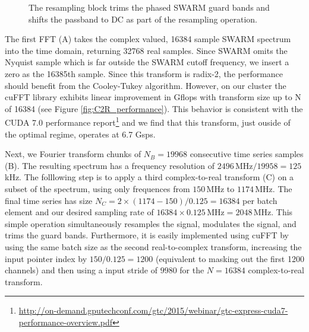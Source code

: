 \begin{figure}[t!]
\linespread{1.}\selectfont{}
\centering
{}
\label{fig:resampling_block}
\caption{The resampling block trims the phased SWARM guard bands and shifts the passband to DC as part of the 
resampling operation.}
\end{figure}

The first FFT (A) takes the complex valued, 16384 sample SWARM spectrum into the time domain, returning 
32768 real samples.  Since SWARM omits the Nyquist sample which is far outside the SWARM cutoff frequency, 
we insert a zero as the 16385th sample.  Since this transform is radix-2, the performance should benefit from 
the Cooley-Tukey algorithm.  However, on our cluster the cuFFT library exhibits linear improvement in Gflops 
with transform size up to N of 16384 (see Figure \ref{fig:C2R_performance}).  This behavior is consistent with 
the CUDA 7.0 performance 
report\footnote{\url{http://on-demand.gputechconf.com/gtc/2015/webinar/gtc-express-cuda7-performance-overview.pdf}} 
and we find that this transform, just ouside of the optimal regime, operates at 6.7 Gsps.

Next, we Fourier transform chunks of $N_B = 19968$ consecutive time series samples (B).  The resulting 
spectrum has a frequency resolution of $2496$\,MHz$/19958=125$\,kHz.  The folllowing step is to apply a third
complex-to-real transform (C) on a subset of the spectrum, using only frequences from $150$\,MHz to $1174$\,MHz.  
The final time series has size $N_C= 2\times(1174-150)/0.125=16384$ per batch element and our desired 
sampling rate of 
$16384 \times 0.125$\,MHz$ = 2048$\,MHz.  This simple operation simultaneously resamples the signal, modulates 
the signal, and trims the guard bands.  Furthermore, it is easily implemented using cuFFT by using the same 
batch size as the second real-to-complex transform, increasing the input pointer index by $150 / 0.125 = 1200$
(equivalent to masking out the first 1200 channels) and then using a input stride of $9980$ for the 
$N=16384$ complex-to-real transform.

